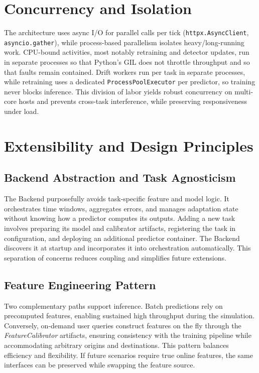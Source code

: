 \section{Concurrency and Isolation}
The architecture uses async I/O for parallel calls per tick (\texttt{httpx.AsyncClient}, \texttt{asyncio.gather}), while process-based parallelism isolates heavy/long-running work. CPU-bound activities, most notably retraining and detector updates, run in separate processes so that Python's GIL does not throttle throughput and so that faults remain contained.
Drift workers run per task in separate processes, while retraining uses a dedicated \texttt{ProcessPoolExecutor} per predictor, so training never blocks inference.
This division of labor yields robust concurrency on multi-core hosts and prevents cross-task interference, while preserving responsiveness under load.

\section{Extensibility and Design Principles}
\subsection{Backend Abstraction and Task Agnosticism}
The Backend purposefully avoids task-specific feature and model logic.
It orchestrates time windows, aggregates errors, and manages adaptation state without knowing how a predictor computes its outputs.
Adding a new task involves preparing its model and calibrator artifacts, registering the task in configuration, and deploying an additional predictor container.
The Backend discovers it at startup and incorporates it into orchestration automatically.
This separation of concerns reduces coupling and simplifies future extensions.

\subsection{Feature Engineering Pattern}
Two complementary paths support inference.
Batch predictions rely on precomputed features, enabling sustained high throughput during the simulation.
Conversely, on-demand user queries construct features on the fly through the \emph{FeatureCalibrator} artifacts, ensuring consistency with the training pipeline while accommodating arbitrary origins and destinations.
This pattern balances efficiency and flexibility.
If future scenarios require true online features, the same interfaces can be preserved while swapping the feature source.

